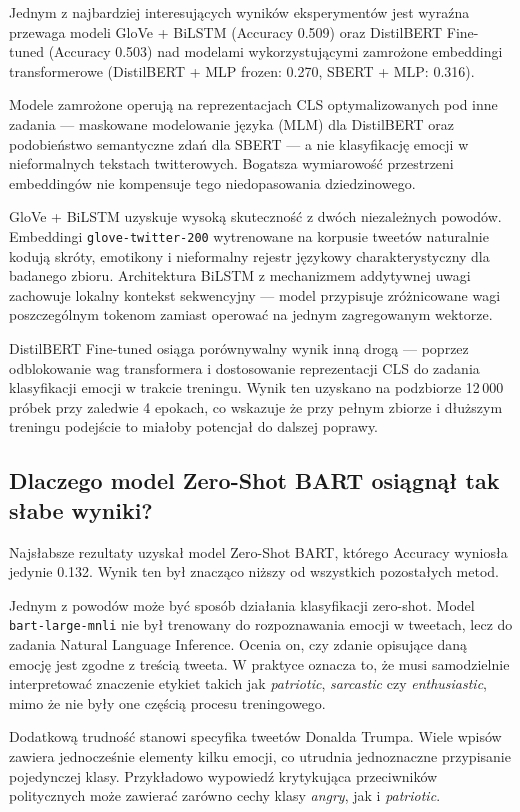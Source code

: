 \documentclass[a4paper,12pt]{article}
\begin{document}
Jednym z najbardziej interesujących wyników eksperymentów jest wyraźna przewaga modeli GloVe + BiLSTM (Accuracy 0.509) oraz DistilBERT Fine-tuned (Accuracy 0.503) nad modelami wykorzystującymi zamrożone embeddingi transformerowe (DistilBERT + MLP frozen: 0.270, SBERT + MLP: 0.316).

Modele zamrożone operują na reprezentacjach CLS optymalizowanych pod inne zadania — maskowane modelowanie języka (MLM) dla DistilBERT oraz podobieństwo semantyczne zdań dla SBERT — a nie klasyfikację emocji w nieformalnych tekstach twitterowych. Bogatsza wymiarowość przestrzeni embeddingów nie kompensuje tego niedopasowania dziedzinowego.

GloVe + BiLSTM uzyskuje wysoką skuteczność z dwóch niezależnych powodów. Embeddingi \texttt{glove-twitter-200} wytrenowane na korpusie tweetów naturalnie kodują skróty, emotikony i nieformalny rejestr językowy charakterystyczny dla badanego zbioru. Architektura BiLSTM z mechanizmem addytywnej uwagi zachowuje lokalny kontekst sekwencyjny — model przypisuje zróżnicowane wagi poszczególnym tokenom zamiast operować na jednym zagregowanym wektorze.

DistilBERT Fine-tuned osiąga porównywalny wynik inną drogą — poprzez odblokowanie wag transformera i dostosowanie reprezentacji CLS do zadania klasyfikacji emocji w trakcie treningu. Wynik ten uzyskano na podzbiorze 12\,000 próbek przy zaledwie 4 epokach, co wskazuje że przy pełnym zbiorze i dłuższym treningu podejście to miałoby potencjał do dalszej poprawy.

\subsection{Dlaczego model Zero-Shot BART osiągnął tak słabe wyniki?}

Najsłabsze rezultaty uzyskał model Zero-Shot BART, którego Accuracy wyniosła jedynie 0.132. Wynik ten był znacząco niższy od wszystkich pozostałych metod.

Jednym z powodów może być sposób działania klasyfikacji zero-shot. Model \texttt{bart-large-mnli} nie był trenowany do rozpoznawania emocji w tweetach, lecz do zadania Natural Language Inference. Ocenia on, czy zdanie opisujące daną emocję jest zgodne z treścią tweeta. W praktyce oznacza to, że musi samodzielnie interpretować znaczenie etykiet takich jak \textit{patriotic}, \textit{sarcastic} czy \textit{enthusiastic}, mimo że nie były one częścią procesu treningowego.

Dodatkową trudność stanowi specyfika tweetów Donalda Trumpa. Wiele wpisów zawiera jednocześnie elementy kilku emocji, co utrudnia jednoznaczne przypisanie pojedynczej klasy. Przykładowo wypowiedź krytykująca przeciwników politycznych może zawierać zarówno cechy klasy \textit{angry}, jak i \textit{patriotic}.
\end{document}
